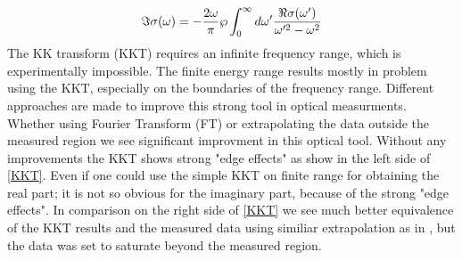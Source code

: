 \documentclass[twocolumn,amsmath,superscriptaddress,amssymb]{revtex4-1}
\begin{document}
	\begin{equation}
		\Im\sigma(\omega)=-\frac{2\omega}{\pi}\wp\int_{0}^{\infty}d\omega'\frac{\Re\sigma(\omega')}{\omega'^2-\omega^2}\\
	\end{equation}
\indent The KK transform (KKT) requires an infinite frequency range, which is experimentally impossible. The finite energy range results mostly in problem using the KKT, especially on the boundaries of the frequency range. Different approaches are made \cite{Johnson, Kuzmenko, Emeis, Llosa} to improve this strong tool in optical measurments. Whether using Fourier Transform (FT) \cite{Johnson} or extrapolating the data outside the measured region \cite{Emeis} we see significant improvment in this optical tool. Without any improvements the KKT shows strong "edge effects" as show in the left side of \ref{KKT}. Even if one could use the simple KKT on finite range for obtaining the real part; it is not so obvious for the imaginary part, because of the strong "edge effects". In comparison on the right side of \ref{KKT} we see much better equivalence of the KKT results and the measured data using similiar extrapolation as in \cite{Emeis}, but the data was set to saturate beyond the measured region. 
\end{document}
